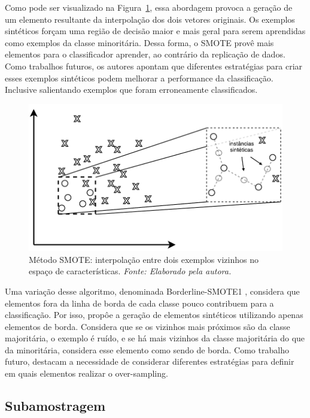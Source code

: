 Como pode ser visualizado na Figura~\ref{fig:smote}, essa abordagem provoca a geração de um elemento resultante da interpolação dos dois vetores originais. Os exemplos sintéticos forçam uma região de decisão maior e mais geral para serem aprendidas como exemplos da classe minoritária. Dessa forma, o SMOTE provê mais elementos para o classificador aprender, ao contrário da replicação de dados. Como trabalhos futuros, os autores apontam que diferentes estratégias para criar esses exemplos sintéticos podem melhorar a performance da classificação. Inclusive salientando exemplos que foram erroneamente classificados.

\begin{figure}[!htbp]
  \begin{center}
    \includegraphics[width=0.7\linewidth]{figuras/smote.pdf}
  \end{center}
  \caption[Método SMOTE: interpolação entre dois exemplos vizinhos no espaço de características.]{Método SMOTE: interpolação entre dois exemplos vizinhos no espaço de características. \textit{Fonte: Elaborado pela autora.}}
  \label{fig:smote}
\end{figure}

Uma variação desse algoritmo, denominada Borderline-SMOTE1 \cite{Han2005}, considera que elementos fora da linha de borda de cada classe pouco contribuem para a classificação. Por isso, propôe a geração de elementos sintéticos utilizando apenas elementos de borda. Considera que se os vizinhos mais próximos são da classe majoritária, o exemplo é ruído, e se há mais vizinhos da classe majoritária do que da minoritária, considera esse elemento como sendo de borda. Como trabalho futuro, destacam a necessidade de considerar diferentes estratégias para definir em quais elementos realizar o over-sampling.


\subsection{Subamostragem}

